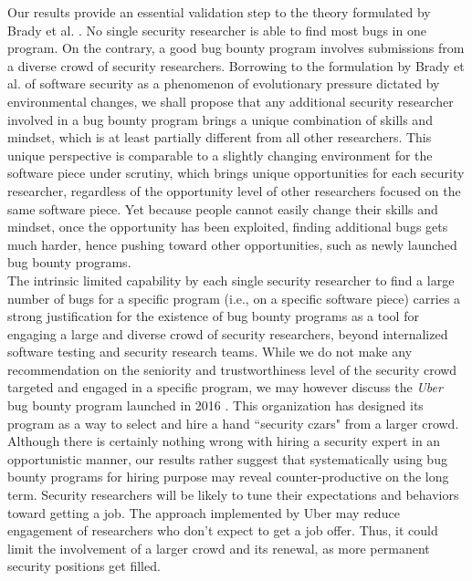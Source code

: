 Our results provide an essential validation step to the theory formulated by Brady et al. \cite{brady1999murphy}. No single security researcher is able to find most bugs in one program. On the contrary, a good bug bounty program involves submissions from a diverse crowd of security researchers. Borrowing to the formulation by Brady et al. of software security as a phenomenon of evolutionary pressure dictated by environmental changes, we shall propose that any additional security researcher involved in a bug bounty program brings a unique combination of skills and mindset, which is at least partially different from all other researchers. This unique perspective is comparable to a slightly changing environment for the software piece under scrutiny, which brings unique opportunities for each security researcher, regardless of the opportunity level of other researchers focused on the same software piece. Yet because people cannot easily change their skills and mindset, once the opportunity has been exploited, finding additional bugs gets much harder, hence pushing toward other opportunities, such as newly launched bug bounty programs.\\

The intrinsic limited capability by each single security researcher to find a large number of bugs for a specific program (i.e., on a specific software piece) carries a strong justification for the existence of bug bounty programs as a tool for engaging a large and diverse crowd of security researchers, beyond internalized software testing and security research teams. While we do not make any recommendation on the seniority and trustworthiness level of the security crowd targeted and engaged in a specific program, we may however discuss the {\it Uber} bug bounty program launched in 2016 \cite{moussouris2016}. This organization has designed its program as a way to select and hire a hand ``security czars" from a larger crowd. Although there is certainly nothing wrong with hiring a security expert in an opportunistic manner, our results rather suggest that systematically using bug bounty programs for hiring purpose may reveal counter-productive on the long term. Security researchers will be likely to tune their expectations and behaviors toward getting a job. The approach implemented by Uber may reduce engagement of researchers who don't expect to get a job offer. Thus, it could limit the involvement of a larger crowd and its renewal, as more permanent security positions get filled. \\

